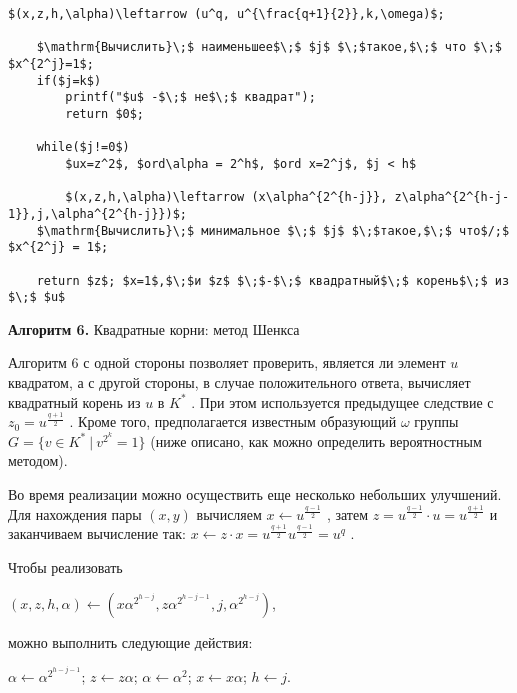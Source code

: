 \documentclass{mai_book}
\begin{document}
%
\begin{lstlisting}[mathescape=true]
$(x,z,h,\alpha)\leftarrow (u^q, u^{\frac{q+1}{2}},k,\omega)$;
    
    $\mathrm{Вычислить}\;$ наименьшее$\;$ $j$ $\;$такое,$\;$ что $\;$ $x^{2^j}=1$;
    if($j=k$)
        printf("$u$ -$\;$ не$\;$ квадрат");
        return $0$;
    
    while($j!=0$)
        $ux=z^2$, $ord\alpha = 2^h$, $ord x=2^j$, $j < h$

        $(x,z,h,\alpha)\leftarrow (x\alpha^{2^{h-j}}, z\alpha^{2^{h-j-1}},j,\alpha^{2^{h-j}})$;
    $\mathrm{Вычислить}\;$ минимальное $\;$ $j$ $\;$такое,$\;$ что$/;$ $x^{2^j} = 1$;
   
    return $z$; $x=1$,$\;$и $z$ $\;$-$\;$ квадратный$\;$ корень$\;$ из $\;$ $u$
\end{lstlisting}


\begin{center}
{\bf Алгоритм 6.} Квадратные корни: метод Шенкса
\end{center}

Алгоритм 6 с одной стороны позволяет проверить, является ли элемент $u$
 квадратом, а с другой стороны, в случае положительного ответа, вычисляет квадратный корень из $u$
 в $K^*$
 .
При этом используется предыдущее следствие с $z_0=u^{\frac{q+1}{2}}$
. Кроме того, предполагается известным образующий $\omega$
 группы $G = \{v\in K^* \ | \ v^{2^k} = 1\}$
 (ниже описано, как можно определить вероятностным методом).

Во время реализации можно осуществить еще несколько небольших улучшений. Для нахождения пары $(x,y)$
 вычисляем $x\leftarrow u^{\frac{q-1}{2}}$
 , затем $z=u^{\frac{q-1}{2}}\cdot u = u^{\frac{q+1}{2}}$
 и заканчиваем вычисление так: $x\leftarrow z\cdot x=u^{\frac{q+1}{2}}u^{\frac{q-1}{2}}=u^q$
 .

Чтобы реализовать

\begin{center}
$(x,z,h,\alpha)\leftarrow (x\alpha^{2^{h-j}},z\alpha^{2^{h-j-1}},j,\alpha^{2^{h-j}})$,
\end{center}


\newpage

можно выполнить следующие действия:

\begin{center}
$\alpha\leftarrow\alpha^{2^{h-j-1}}$; $z\leftarrow z\alpha$; $\alpha\leftarrow\alpha^2$; $x\leftarrow x\alpha$; $h\leftarrow j$.
\end{center}
\end{document}
